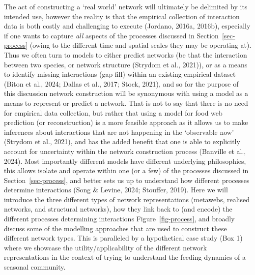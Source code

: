\documentclass[
]{article}
\begin{document}
The act of constructing a `real world' network will ultimately be
delimited by its intended use, however the reality is that the empirical
collection of interaction data is both costly and challenging to execute
(Jordano, 2016a, 2016b), especially if one wants to capture \emph{all}
aspects of the processes discussed in Section~\ref{sec-process} (owing
to the different time and spatial scales they may be operating at). Thus
we often turn to models to either predict networks (be that the
interaction between two species, or network structure (Strydom et al.,
2021)), or as a means to identify missing interactions (gap fill) within
an existing empirical dataset (Biton et al., 2024; Dallas et al., 2017;
Stock, 2021), and so for the purpose of this discussion network
construction will be synonymous with using a model as a means to
represent or predict a network. That is not to say that there is no need
for empirical data collection, but rather that using a model for food
web prediction (or reconstruction) is a more feasible approach as it
allows us to make inferences about interactions that are not happening
in the `observable now' (Strydom et al., 2021), and has the added
benefit that one is able to explicitly account for uncertainty within
the network construction process (Banville et al., 2024). Most
importantly different models have different underlying philosophies,
this allows isolate and operate within one (or a few) of the processes
discussed in Section~\ref{sec-process}, and better sets us up to
understand how different processes determine interactions (Song \&
Levine, 2024; Stouffer, 2019). Here we will introduce the three
different types of network representations (metawebs, realised networks,
and structural networks), how they link back to (and encode) the
different processes determining interactions Figure~\ref{fig-process},
and broadly discuss some of the modelling approaches that are used to
construct these different network types. This is paralleled by a
hypothetical case study (Box 1) where we showcase the
utility/applicability of the different network representations in the
context of trying to understand the feeding dynamics of a seasonal
community.
\end{document}
